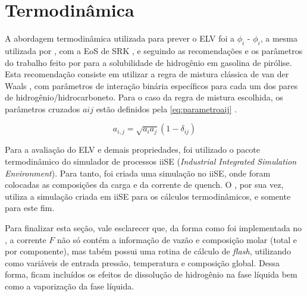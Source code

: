 
\section{Termodinâmica} \label{sec:termodinamica}

A abordagem termodinâmica utilizada para prever o ELV foi a $\phi_i$ -
$\phi_i$, a mesma utilizada por , com a EoS de SRK
\cite{Soave1972}, e seguindo as recomendações e os parâmetros do trabalho feito
por  para a solubilidade de hidrogênio em gasolina de
pirólise. Esta recomendação consiste em utilizar a regra de mistura clássica de
van der Waals \cite{VanderWaals1873}, com parâmetros de interação binária
específicos para cada um dos pares de hidrogênio/hidrocarboneto. Para o caso da
regra de mistura escolhida, os parâmetros cruzados $aij$ estão definidos pela
\autoref{eq:parametroaij} \cite{Peng1976,Soave1972}.

\begin{equation}
a_{i,j} = \sqrt{a_ia_j}(1-\delta_{ij})
\label{eq:parametroaij}
\end{equation}

Para a avaliação do ELV e demais propriedades, foi utilizado o pacote
termodinâmico do simulador de processos iiSE (\emph{Industrial Integrated
Simulation Environment}). Para tanto, foi criada uma simulação no iiSE, onde
foram colocadas as composições da carga e da corrente de quench. O \emso, por
sua vez, utiliza a simulação criada em iiSE para os cálculos termodinâmicos, e
somente para este fim. 

Para finalizar esta seção, vale esclarecer que, da forma como foi implementada
no \emso, a corrente $F$ não só contém a informação de vazão e composição molar
(total e por componente), mas tabém possui uma rotina de cálculo de
\emph{flash}, utilizando como variáveis de entrada pressão, temperatura e
composição global. Dessa forma, ficam incluídos os efeitos de dissolução de
hidrogênio na fase líquida bem como a vaporização da fase líquida.

